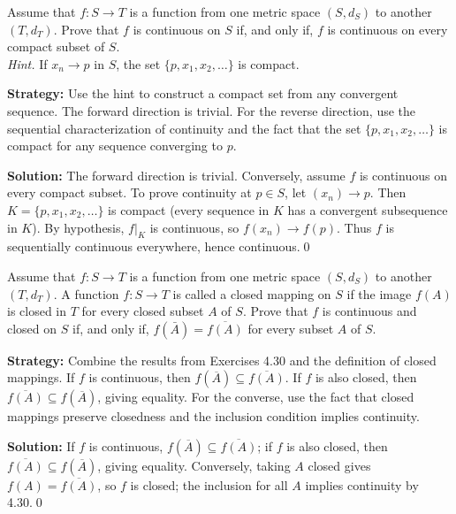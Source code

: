 \begin{problembox}
Assume that $f : S \rightarrow T$ is a function from one metric space $(S, d_S)$ to another $(T, d_T)$. Prove that $f$ is continuous on $S$ if, and only if, $f$ is continuous on every compact subset of $S$. \\
\textit{Hint.} If $x_n \rightarrow p$ in $S$, the set $\{p, x_1, x_2, \ldots\}$ is compact.
\end{problembox}

\noindent\textbf{Strategy:} Use the hint to construct a compact set from any convergent sequence. The forward direction is trivial. For the reverse direction, use the sequential characterization of continuity and the fact that the set $\{p, x_1, x_2, \ldots\}$ is compact for any sequence converging to $p$.

\bigskip\noindent\textbf{Solution:}
The forward direction is trivial. Conversely, assume $f$ is continuous on every compact subset. To prove continuity at $p\in S$, let $(x_n)\to p$. Then $K=\{p,x_1,x_2,\ldots\}$ is compact (every sequence in $K$ has a convergent subsequence in $K$). By hypothesis, $f|_K$ is continuous, so $f(x_n)\to f(p)$. Thus $f$ is sequentially continuous everywhere, hence continuous.\qed



\begin{problembox}
Assume that $f : S \rightarrow T$ is a function from one metric space $(S, d_S)$ to another $(T, d_T)$. A function $f : S \rightarrow T$ is called a closed mapping on $S$ if the image $f(A)$ is closed in $T$ for every closed subset $A$ of $S$. Prove that $f$ is continuous and closed on $S$ if, and only if, $f(\bar{A}) = \overline{f(A)}$ for every subset $A$ of $S$.
\end{problembox}

\noindent\textbf{Strategy:} Combine the results from Exercises 4.30 and the definition of closed mappings. If $f$ is continuous, then $f(\overline{A}) \subseteq \overline{f(A)}$. If $f$ is also closed, then $\overline{f(A)} \subseteq f(\overline{A})$, giving equality. For the converse, use the fact that closed mappings preserve closedness and the inclusion condition implies continuity.

\bigskip\noindent\textbf{Solution:}
If $f$ is continuous, $f(\overline{A})\subseteq\overline{f(A)}$; if $f$ is also closed, then $\overline{f(A)}\subseteq f(\overline{A})$, giving equality. Conversely, taking $A$ closed gives $f(A)=\overline{f(A)}$, so $f$ is closed; the inclusion for all $A$ implies continuity by 4.30.\qed



